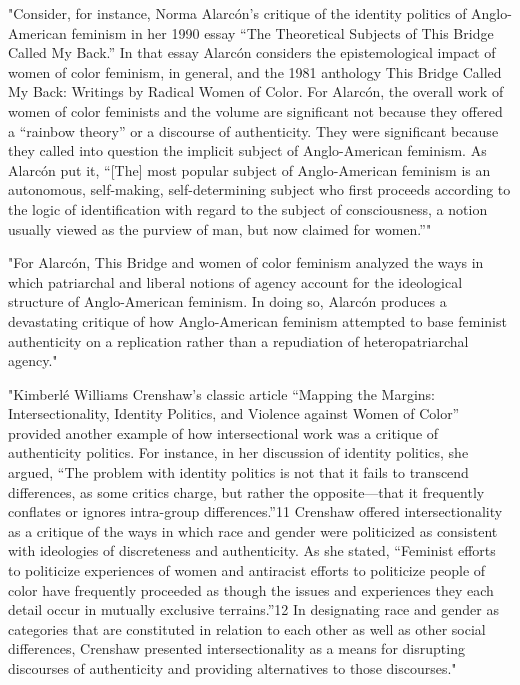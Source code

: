 \documentclass[11pt]{article}
\begin{document}
\begin{enumerate}
"Consider, for instance, Norma Alarcón’s critique of the identity
politics of Anglo-American feminism in her 1990 essay “The Theoretical
Subjects of This Bridge Called My Back.” In that essay Alarcón
considers the epistemological impact of women of color feminism, in
general, and the 1981 anthology This Bridge Called My Back: Writings
by Radical Women of Color. For Alarcón, the overall work of women of
color feminists and the volume are significant not because they
offered a “rainbow theory” or a discourse of authenticity. They were
significant because they called into question the implicit subject of
Anglo-American feminism. As Alarcón put it, “[The] most popular
subject of Anglo-American feminism is an autonomous, self-making,
self-determining subject who first proceeds according to the logic of
identification with regard to the subject of consciousness, a notion
usually viewed as the purview of man, but now claimed for women.”"

"For Alarcón, This Bridge and women of color feminism analyzed the
ways in which patriarchal and liberal notions of agency account for
the ideological structure of Anglo-American feminism. In doing so,
Alarcón produces a devastating critique of how Anglo-American feminism
attempted to base feminist authenticity on a replication rather than a
repudiation of heteropatriarchal agency."

"Kimberlé Williams Crenshaw’s classic article “Mapping the Margins:
Intersectionality, Identity Politics, and Violence against Women of
Color” provided another example of how intersectional work was a
critique of authenticity politics. For instance, in her discussion of
identity politics, she argued, “The problem with identity politics is
not that it fails to transcend differences, as some critics charge,
but rather the opposite—that it frequently conflates or ignores
intra-group differences.”11 Crenshaw offered intersectionality as a
critique of the ways in which race and gender were politicized as
consistent with ideologies of discreteness and authenticity. As she
stated, “Feminist efforts to politicize experiences of women and
antiracist efforts to politicize people of color have frequently
proceeded as though the issues and experiences they each detail occur
in mutually exclusive terrains.”12 In designating race and gender as
categories that are constituted in relation to each other as well as
other social differences, Crenshaw presented intersectionality as a
means for disrupting discourses of authenticity and providing
alternatives to those discourses."


\end{enumerate}
\end{document}
